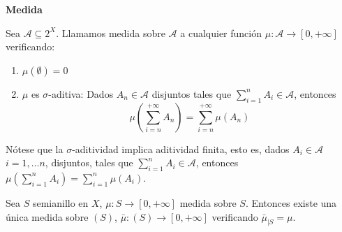 \begin{definition} \textbf{Medida}

 Sea $\mathcal{A} \subseteq 2^X$. Llamamos medida sobre $\mathcal{A}$ a cualquier función 
 $\mu: \mathcal{A} \rightarrow [0, +\infty]$ verificando:

 \begin{enumerate}[i]
  \item $\mu(\emptyset) = 0$
  \item $\mu$ es $\sigma$-aditiva: Dados $A_n \in \mathcal{A}$ disjuntos tales que $\sum_{i=1}^n A_i \in \mathcal{A}$, 
  entonces \[\mu\left(\sum_{i=n}^{+\infty} A_n \right)= \sum_{i=n}^{+\infty} \mu(A_n)\]
 \end{enumerate}
\end{definition}

Nótese que la $\sigma$-aditividad implica aditividad finita, esto es, dados $A_i \in \mathcal{A}$ $i=1, \ldots n$,
disjuntos, tales que $\sum_{i=1}^n A_i \in \mathcal{A}$, entonces $\mu\left(\sum_{i=1}^{n} A_i \right)= \sum_{i=1}^{n} \mu(A_i)$.

\begin{theorem}
 Sea $S$ semianillo en $X$, $\mu: S \rightarrow [0,+\infty]$ medida sobre $S$. Entonces existe una única medida 
 sobre $(S)$, $\bar{\mu}: (S) \rightarrow [0,+\infty]$ verificando $\bar{\mu}_{|S} = \mu$.
 
 \label{th:ext-semitoring}
\end{theorem}

